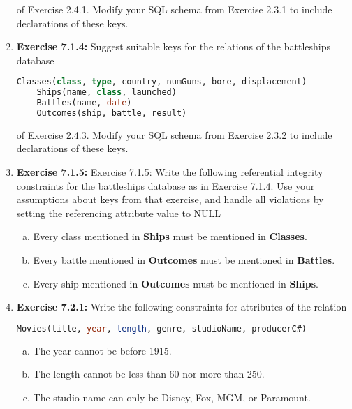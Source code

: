 \documentclass[12pt]{article}
\begin{document}
\begin{enumerate}[1.]
    \bigskip

    of Exercise 2.4.1. Modify your SQL schema from Exercise 2.3.1 to include
    declarations of these keys.

    \item \textbf{Exercise 7.1.4:} Suggest suitable keys for the relations of the battleships
    database

    \bigskip

    \begin{lstlisting}[language=SQL]
    Classes(class, type, country, numGuns, bore, displacement)
    Ships(name, class, launched)
    Battles(name, date)
    Outcomes(ship, battle, result)
    \end{lstlisting}

    \bigskip

    of Exercise 2.4.3. Modify your SQL schema from Exercise 2.3.2 to include
    declarations of these keys.

    \item \textbf{Exercise 7.1.5:} Exercise 7.1.5: Write the following referential
    integrity constraints for the battleships database as in Exercise 7.1.4. Use
    your assumptions about keys from that exercise, and handle all violations by
    setting the referencing attribute value to NULL

    \begin{enumerate}[a)]
        \item Every class mentioned in \textbf{Ships} must be mentioned in \textbf{Classes}.
        \item Every battle mentioned in \textbf{Outcomes} must be mentioned in \textbf{Battles}.
        \item Every ship mentioned in \textbf{Outcomes} must be mentioned in \textbf{Ships}.
    \end{enumerate}

    \item \textbf{Exercise 7.2.1:} Write the following constraints for attributes of the relation

    \begin{lstlisting}[language=SQL]
    Movies(title, year, length, genre, studioName, producerC#)
    \end{lstlisting}

    \bigskip

    \begin{enumerate}[a)]
        \item The year cannot be before 1915.
        \item The length cannot be less than 60 nor more than 250.
        \item The studio name can only be Disney, Fox, MGM, or Paramount.
    \end{enumerate}


\end{enumerate}
\end{document}
